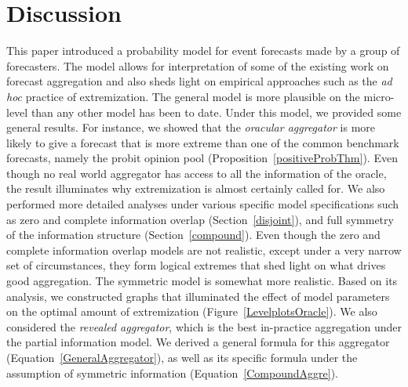 \documentclass[11pt]{article}
\theoremstyle{definition}
\theoremstyle{definition}
\begin{document}
\section{Discussion}
\label{discussion}
This paper introduced a probability model for event forecasts made 
by a group of forecasters.  The model allows for interpretation
of some of the existing work on forecast aggregation and also sheds 
light on empirical approaches such as the {\em ad hoc} practice of extremization.  
The general model is more plausible on the micro-level than any other model has
been to date. Under this model, we provided some general results. For instance,
we showed that the \textit{oracular aggregator} is more likely to give a forecast that is more extreme 
than one of the common benchmark forecasts, namely the probit
opinion pool (Proposition~\ref{positiveProbThm}).  Even though no 
real world aggregator has access to all the information of the 
oracle, the result illuminates why extremization is almost 
certainly called for.  We also performed more detailed analyses under various
specific model specifications such as zero and complete information overlap (Section~\ref{disjoint}), and full
symmetry of the information structure (Section~\ref{compound}).
Even though the zero and complete information overlap models are not realistic, except
under a very narrow set of circumstances, they form logical extremes
that shed light on what drives good aggregation. The symmetric 
model is somewhat more realistic.  Based on its analysis, we 
constructed graphs that illuminated the effect of model parameters 
on the optimal amount of extremization (Figure~\ref{LevelplotsOracle}).
We also considered the {\em revealed aggregator}, which is the
best in-practice aggregation under the partial information model.
We derived a general formula for this aggregator 
(Equation~\ref{GeneralAggregator}), as well as its specific formula 
under the assumption of symmetric information (Equation~\ref{CompoundAggre}).
\end{document}

